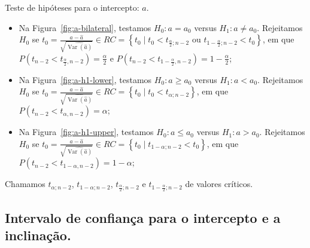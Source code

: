 \documentclass[8pt]{beamer}
\DeclareMathOperator{\vari}{Var}
\begin{document}
\begin{frame}{Teste de hipóteses para o intercepto: $a$.}

\begin{itemize}
	\item Na Figura~\ref{fig:a-bilateral}, testamos $H_0: a = a_0$ versus $H_1: a \neq a_0$. Rejeitamos $H_0$ se $t_0 = \frac{a  - \hat{a}}{\sqrt{\widehat{\vari({\hat{a}})}}} \allowbreak  \in RC = \left\{ t_0 \mid t_0 < t_{\frac{\alpha}{2};n-2}\mbox{ ou } t_{1-\frac{\alpha}{2}; n-2} < t_0 \right\}$, em que $P\left(t_{n-2} < t_{\frac{\alpha}{2},n-2}\right) = \frac{\alpha}{2}$ e $P\left(t_{n-2} < t_{1-\frac{\alpha}{2},n-2}\right) = 1-\frac{\alpha}{2}$;
	\vfill
	
	\item Na Figura~\ref{fig:a-h1-lower}, testamos $H_0: a \geq a_0$ versus $H_1: a < a_0$. Rejeitamos $H_0$ se $t_0 = \frac{a  - \hat{a}}{\sqrt{\widehat{\vari({\hat{a}})}}} \allowbreak  \in RC = \left\{ t_0 \mid t_0 < t_{\alpha;n-2} \right\}$, em que $P\left(t_{n-2} < t_{\alpha,n-2}\right) = \alpha$;
	\vfill
	
	\item Na Figura~\ref{fig:a-h1-upper}, testamos $H_0: a \leq a_0$ versus $H_1: a > a_0$. Rejeitamos $H_0$ se $t_0 = \frac{a  - \hat{a}}{\sqrt{\widehat{\vari({\hat{a}})}}} \allowbreak  \in RC = \left\{ t_0 \mid  t_{1-\alpha; n-2} < t_0 \right\}$, em que $P\left(t_{n-2} < t_{1-\alpha,n-2}\right) =1- \alpha$;
\end{itemize}

Chamamos $t_{\alpha; n-2}$, $t_{1-\alpha; n-2}$, $t_{\frac{\alpha}{2}; n-2}$ e $t_{1-\frac{\alpha}{2}; n-2}$ de valores críticos.

\end{frame}



\subsection{Intervalo de confiança para o intercepto e a inclinação.}
\end{document}
